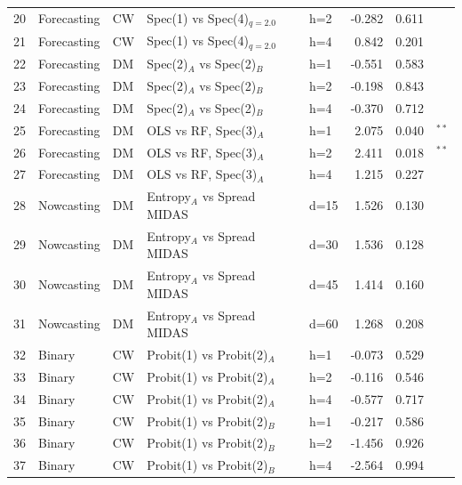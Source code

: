 \begin{table}[htbp]
\begin{tabular}{rllllrrl}
  20 & Forecasting & CW & Spec(1) vs Spec(4)$_{q=2.0}$ & h=2 & -0.282 & 0.611 &  \\
  21 & Forecasting & CW & Spec(1) vs Spec(4)$_{q=2.0}$ & h=4 & 0.842 & 0.201 &  \\
  22 & Forecasting & DM & Spec(2)$_A$ vs Spec(2)$_B$ & h=1 & -0.551 & 0.583 &  \\
  23 & Forecasting & DM & Spec(2)$_A$ vs Spec(2)$_B$ & h=2 & -0.198 & 0.843 &  \\
  24 & Forecasting & DM & Spec(2)$_A$ vs Spec(2)$_B$ & h=4 & -0.370 & 0.712 &  \\
  25 & Forecasting & DM & OLS vs RF, Spec(3)$_A$ & h=1 & 2.075 & 0.040 & $^{**}$ \\
  26 & Forecasting & DM & OLS vs RF, Spec(3)$_A$ & h=2 & 2.411 & 0.018 & $^{**}$ \\
  27 & Forecasting & DM & OLS vs RF, Spec(3)$_A$ & h=4 & 1.215 & 0.227 &  \\
  28 & Nowcasting & DM & Entropy$_A$ vs Spread MIDAS & d=15 & 1.526 & 0.130 &  \\
  29 & Nowcasting & DM & Entropy$_A$ vs Spread MIDAS & d=30 & 1.536 & 0.128 &  \\
  30 & Nowcasting & DM & Entropy$_A$ vs Spread MIDAS & d=45 & 1.414 & 0.160 &  \\
  31 & Nowcasting & DM & Entropy$_A$ vs Spread MIDAS & d=60 & 1.268 & 0.208 &  \\
  32 & Binary & CW & Probit(1) vs Probit(2)$_{A}$ & h=1 & -0.073 & 0.529 &  \\
  33 & Binary & CW & Probit(1) vs Probit(2)$_{A}$ & h=2 & -0.116 & 0.546 &  \\
  34 & Binary & CW & Probit(1) vs Probit(2)$_{A}$ & h=4 & -0.577 & 0.717 &  \\
  35 & Binary & CW & Probit(1) vs Probit(2)$_{B}$ & h=1 & -0.217 & 0.586 &  \\
  36 & Binary & CW & Probit(1) vs Probit(2)$_{B}$ & h=2 & -1.456 & 0.926 &  \\
  37 & Binary & CW & Probit(1) vs Probit(2)$_{B}$ & h=4 & -2.564 & 0.994 &  \\
\bottomrule
\end{tabular}
\end{table}